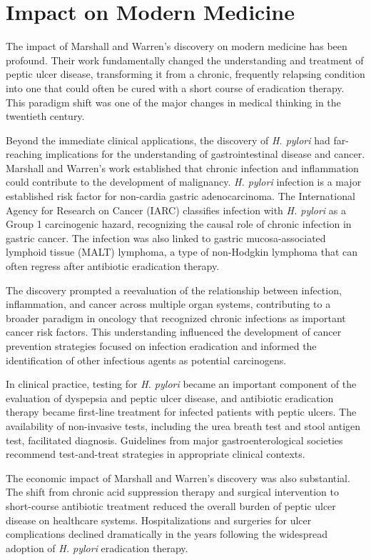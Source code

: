 \section{Impact on Modern Medicine}

The impact of Marshall and Warren's discovery on modern medicine has been profound. Their work fundamentally changed the understanding and treatment of peptic ulcer disease, transforming it from a chronic, frequently relapsing condition into one that could often be cured with a short course of eradication therapy. This paradigm shift was one of the major changes in medical thinking in the twentieth century.

Beyond the immediate clinical applications, the discovery of \textit{H. pylori} had far-reaching implications for the understanding of gastrointestinal disease and cancer. Marshall and Warren's work established that chronic infection and inflammation could contribute to the development of malignancy. \textit{H. pylori} infection is a major established risk factor for non-cardia gastric adenocarcinoma. The International Agency for Research on Cancer (IARC) classifies infection with \textit{H. pylori} as a Group 1 carcinogenic hazard, recognizing the causal role of chronic infection in gastric cancer. The infection was also linked to gastric mucosa-associated lymphoid tissue (MALT) lymphoma, a type of non-Hodgkin lymphoma that can often regress after antibiotic eradication therapy.

The discovery prompted a reevaluation of the relationship between infection, inflammation, and cancer across multiple organ systems, contributing to a broader paradigm in oncology that recognized chronic infections as important cancer risk factors. This understanding influenced the development of cancer prevention strategies focused on infection eradication and informed the identification of other infectious agents as potential carcinogens.

In clinical practice, testing for \textit{H. pylori} became an important component of the evaluation of dyspepsia and peptic ulcer disease, and antibiotic eradication therapy became first-line treatment for infected patients with peptic ulcers. The availability of non-invasive tests, including the urea breath test and stool antigen test, facilitated diagnosis. Guidelines from major gastroenterological societies recommend test-and-treat strategies in appropriate clinical contexts.

The economic impact of Marshall and Warren's discovery was also substantial. The shift from chronic acid suppression therapy and surgical intervention to short-course antibiotic treatment reduced the overall burden of peptic ulcer disease on healthcare systems. Hospitalizations and surgeries for ulcer complications declined dramatically in the years following the widespread adoption of \textit{H. pylori} eradication therapy.

